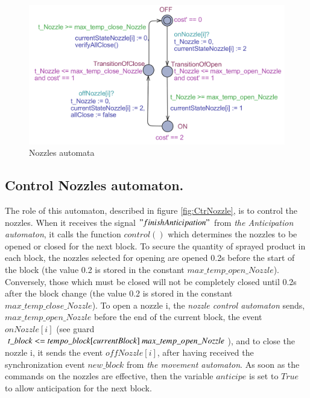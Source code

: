 \begin{figure}[ht!]
	\begin{center}
		\includegraphics[scale = 0.8, angle =90]{nozzle.png}
		\caption{Nozzles automata} 
		\label{fig:nozzle}
	\end{center}
\end{figure}

\subsection{\textbf{Control Nozzles automaton.}} The role of this automaton, described in figure \ref{fig:CtrNozzle}, is to control the nozzles. When it receives the signal $ "finishAnticipation"$ from \textit{the Anticipation automaton}, it calls the function $control ()$ which determines the nozzles to be opened or closed for the next block. To secure the quantity of sprayed product in each block, the nozzles selected for opening are opened 0.2s before the start of the block (the value 0.2 is stored in the constant $ max\_temp\_open\_Nozzle $). Conversely, those which must be closed will not be completely closed until 0.2s after the block change (the value 0.2 is stored in the constant $ max\_temp\_close\_Nozzle $). To open a nozzle i, the \textit{nozzle control automaton} sends, 
$max\_temp\_open\_Nozzle $ before the end of the current block, the event $onNozzle [i]$  (see guard $t\_block <= tempo\_block[currentBlock]\-\ max\_temp\_open\_Nozzle $), and to close the nozzle i, it sends the event $offNozzle [i]$, after having received the synchronization event $new\_block$ from \textit{the movement automaton}. As soon as the commands on the nozzles are effective, then the variable $anticipe$ is set to $ True $ to allow anticipation for the next block.


